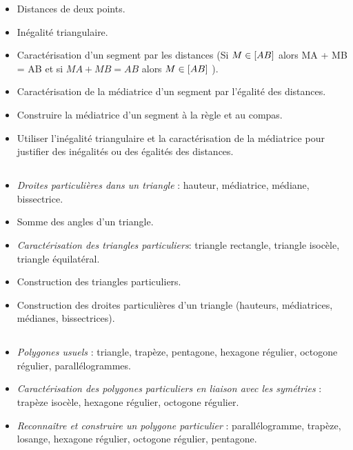 \savoir
\begin{itemize}
\item Distances de deux points.
\item Inégalité triangulaire.
\item  Caractérisation d'un segment par les distances (Si $M\in\left[AB\right]$ alors  MA + MB = AB et si $MA+MB=AB$
alors $M\in\left[AB\right]$ ).
\item Caractérisation de la médiatrice d'un segment par l'égalité des distances.
\end{itemize}
\savoirfaire
\begin{itemize}
\item Construire la médiatrice d'un segment à la règle et au compas.
\item Utiliser l'inégalité triangulaire et la caractérisation de la médiatrice pour justifier des inégalités ou des égalités des distances.
\end{itemize}

\subsection*{}

\savoir
\begin{itemize}
\item \textit{ Droites particulières dans un triangle} : hauteur, médiatrice, médiane, bissectrice.
\item Somme des angles d'un triangle.
\item \textit{Caractérisation des triangles particuliers}: triangle rectangle, triangle isocèle, triangle équilatéral.
\end{itemize}
\savoirfaire
\begin{itemize}
\item Construction des triangles particuliers.
\item Construction des droites particulières d'un triangle (hauteurs, médiatrices, médianes, bissectrices).
\end{itemize}

\subsection*{}

\savoir
\begin{itemize}
\item \textit{Polygones usuels} : triangle, trapèze, pentagone, hexagone régulier, octogone régulier, parallélogrammes.
\end{itemize}
\savoirfaire
\begin{itemize}
\item \textit{Caractérisation des polygones particuliers en liaison avec les symétries} : trapèze isocèle, hexagone
régulier, octogone régulier.
\item \textit{Reconnaître et construire un polygone particulier} : parallélogramme, trapèze, losange, hexagone régulier, octogone régulier, pentagone.
\end{itemize}

